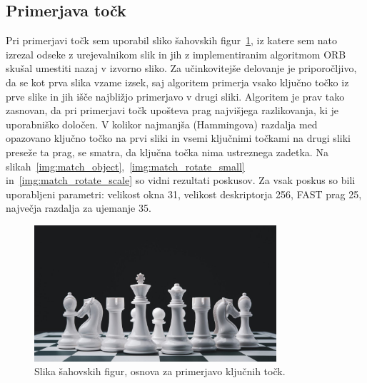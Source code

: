 \documentclass[a4paper,11pt]{article}
\begin{document}
\clearpage

\subsection{Primerjava točk}

Pri primerjavi točk sem uporabil sliko šahovskih figur~\ref{img:match_base}, iz katere sem nato izrezal odseke z urejevalnikom slik in jih z implementiranim algoritmom ORB skušal umestiti nazaj v izvorno sliko. Za učinkovitejše delovanje je priporočljivo, da se kot prva slika vzame izsek, saj algoritem primerja vsako ključno točko iz prve slike in jih išče najbližjo primerjavo v drugi sliki. Algoritem je prav tako zasnovan, da pri primerjavi točk upošteva prag najvišjega razlikovanja, ki je uporabniško določen. V kolikor najmanjša (Hammingova) razdalja med opazovano ključno točko na prvi sliki in vsemi ključnimi točkami na drugi sliki preseže ta prag, se smatra, da ključna točka nima ustreznega zadetka. Na slikah~\ref{img:match_object},~\ref{img:match_rotate_small} in~\ref{img:match_rotate_scale} so vidni rezultati poskusov. Za vsak poskus so bili uporabljeni parametri: velikost okna 31, velikost deskriptorja 256, FAST prag 25, največja razdalja za ujemanje 35.


\begin{figure}[hb]
	\centering
	\includegraphics[width=0.8\textwidth]{images/chess.jpg}
	\caption{Slika šahovskih figur, osnova za primerjavo ključnih točk.}
	\label{img:match_base}
\end{figure}
\end{document}
